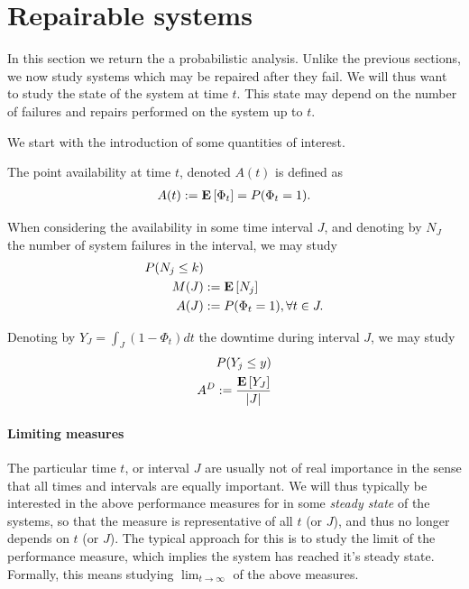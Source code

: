 \section{Repairable systems}
In this section we return the a probabilistic analysis.
Unlike the previous sections, we now study systems which may be repaired after they fail.
We will thus want to study the state of the system at time $t$.
This state may depend on the number of failures and repairs performed on the system up to $t$.

We start with the introduction of some quantities of interest.
\begin{definition}
The point availability at time $t$, denoted $A(t)$ is defined as 
\begin{align}
	A(t):= \mathbf{E}\left[ \Phi_t \right]=P(\Phi_t=1) .
\end{align}
\end{definition}

\begin{definition}
When considering the availability in some time interval $J$, and denoting by $N_J$ the number of system failures in the interval, we may study
\begin{align}
	P(N_j\leq k) &\\
	M(J) &:= \mathbf{E}\left[ N_j \right] \\
	A(J) &:= P(\Phi_t=1), \forall t \in J.
\end{align}
\end{definition}


\begin{definition}
Denoting by $Y_J=\int_J (1-\Phi_t) dt$ the downtime during interval $J$, we may study
\begin{align}
	P(Y_j \leq y) &	\\
	A^D := \frac{\mathbf{E}\left[ Y_J \right]}{|J|}
\end{align}
\end{definition}

\paragraph{Limiting measures} The particular time $t$, or interval $J$ are usually not of real importance in the sense that all times and intervals are equally important.
We will thus typically be interested in the above performance measures for in some \emph{steady state} of the systems, so that the measure is representative of all $t$ (or $J$), and thus no longer depends on $t$ (or $J$).
The typical approach for this is to study the limit of the performance measure, which implies the system has reached it's steady state. Formally, this means studying $\lim_{t \to \infty}$ of the above measures. 


